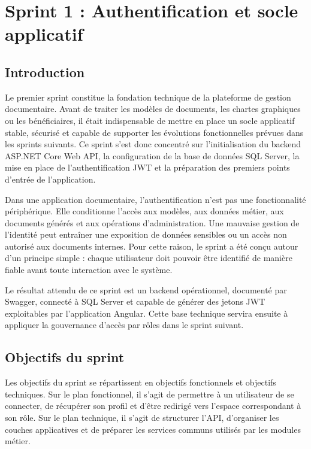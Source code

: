 \documentclass[12pt,a4paper]{report}
\begin{document}

\chapter{Sprint 1 : Authentification et socle applicatif}

\section{Introduction}

Le premier sprint constitue la fondation technique de la plateforme de gestion documentaire. Avant de traiter les modèles de documents, les chartes graphiques ou les bénéficiaires, il était indispensable de mettre en place un socle applicatif stable, sécurisé et capable de supporter les évolutions fonctionnelles prévues dans les sprints suivants. Ce sprint s'est donc concentré sur l'initialisation du backend ASP.NET Core Web API, la configuration de la base de données SQL Server, la mise en place de l'authentification JWT et la préparation des premiers points d'entrée de l'application.

Dans une application documentaire, l'authentification n'est pas une fonctionnalité périphérique. Elle conditionne l'accès aux modèles, aux données métier, aux documents générés et aux opérations d'administration. Une mauvaise gestion de l'identité peut entraîner une exposition de données sensibles ou un accès non autorisé aux documents internes. Pour cette raison, le sprint a été conçu autour d'un principe simple : chaque utilisateur doit pouvoir être identifié de manière fiable avant toute interaction avec le système.

Le résultat attendu de ce sprint est un backend opérationnel, documenté par Swagger, connecté à SQL Server et capable de générer des jetons JWT exploitables par l'application Angular. Cette base technique servira ensuite à appliquer la gouvernance d'accès par rôles dans le sprint suivant.

\section{Objectifs du sprint}

Les objectifs du sprint se répartissent en objectifs fonctionnels et objectifs techniques. Sur le plan fonctionnel, il s'agit de permettre à un utilisateur de se connecter, de récupérer son profil et d'être redirigé vers l'espace correspondant à son rôle. Sur le plan technique, il s'agit de structurer l'API, d'organiser les couches applicatives et de préparer les services communs utilisés par les modules métier.
\end{document}
